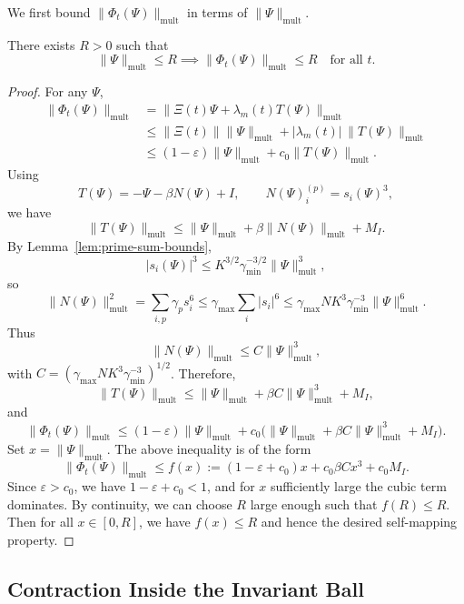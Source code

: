 \documentclass[11pt]{article}
\begin{document}
We first bound \(\|\Phi_t(\Psi)\|_{\mathrm{mult}}\) in terms of \(\|\Psi\|_{\mathrm{mult}}\).

\begin{lemma}
\label{lem:self-mapping}
There exists \(R>0\) such that
\[
\|\Psi\|_{\mathrm{mult}} \le R \implies \|\Phi_t(\Psi)\|_{\mathrm{mult}} \le R
\quad \text{for all } t.
\]
\end{lemma}

\begin{proof}
For any \(\Psi\),
\[
\begin{aligned}
\|\Phi_t(\Psi)\|_{\mathrm{mult}}
&= \|\Xi(t)\Psi + \lambda_m(t)T(\Psi)\|_{\mathrm{mult}} \\
&\le \|\Xi(t)\|\|\Psi\|_{\mathrm{mult}} + |\lambda_m(t)|\,\|T(\Psi)\|_{\mathrm{mult}} \\
&\le (1-\varepsilon)\|\Psi\|_{\mathrm{mult}} + c_0 \|T(\Psi)\|_{\mathrm{mult}}.
\end{aligned}
\]
Using
\[
T(\Psi) = -\Psi - \beta N(\Psi) + I,
\qquad
N(\Psi)_i^{(p)} = s_i(\Psi)^3,
\]
we have
\[
\|T(\Psi)\|_{\mathrm{mult}}
\le \|\Psi\|_{\mathrm{mult}} + \beta \|N(\Psi)\|_{\mathrm{mult}} + M_I.
\]
By Lemma~\ref{lem:prime-sum-bounds},
\[
|s_i(\Psi)|^3
\le K^{3/2}\gamma_{\min}^{-3/2}\|\Psi\|_{\mathrm{mult}}^3,
\]
so
\[
\|N(\Psi)\|_{\mathrm{mult}}^2
= \sum_{i,p}\gamma_p s_i^6
\le \gamma_{\max}\sum_i |s_i|^6
\le \gamma_{\max} N K^3 \gamma_{\min}^{-3}\|\Psi\|_{\mathrm{mult}}^6.
\]
Thus
\[
\|N(\Psi)\|_{\mathrm{mult}}
\le C \|\Psi\|_{\mathrm{mult}}^3,
\]
with \(C = (\gamma_{\max} N K^3 \gamma_{\min}^{-3})^{1/2}\).
Therefore,
\[
\|T(\Psi)\|_{\mathrm{mult}}
\le \|\Psi\|_{\mathrm{mult}} + \beta C \|\Psi\|_{\mathrm{mult}}^3 + M_I,
\]
and
\[
\|\Phi_t(\Psi)\|_{\mathrm{mult}}
\le (1-\varepsilon)\|\Psi\|_{\mathrm{mult}}
+ c_0\bigl(\|\Psi\|_{\mathrm{mult}} + \beta C\|\Psi\|_{\mathrm{mult}}^3 + M_I\bigr).
\]
Set \(x = \|\Psi\|_{\mathrm{mult}}\).
The above inequality is of the form
\[
\|\Phi_t(\Psi)\|_{\mathrm{mult}}
\le f(x)
:= (1-\varepsilon + c_0)x + c_0\beta C x^3 + c_0 M_I.
\]
Since \(\varepsilon>c_0\), we have \(1-\varepsilon + c_0 < 1\), and for \(x\) sufficiently large the cubic term dominates.
By continuity, we can choose \(R\) large enough such that \(f(R) \le R\).
Then for all \(x \in [0,R]\), we have \(f(x)\le R\) and hence the desired self-mapping property.
\end{proof}

\subsection{Contraction Inside the Invariant Ball}
\end{document}
